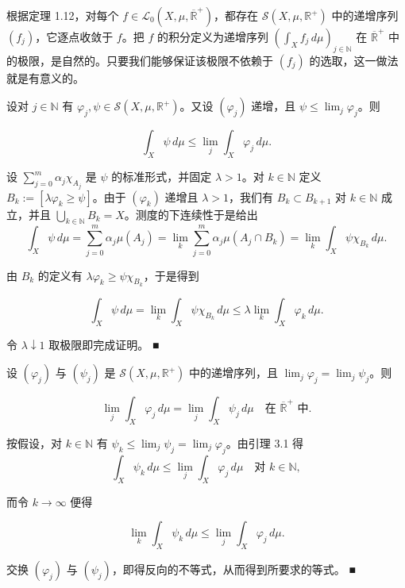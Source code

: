根据定理 1.12，对每个 $ f \in \mathcal{L}_0(X,\mu,\overline{\mathbb{R}}^+) $，都存在 $ \mathcal{S}(X,\mu,\mathbb{R}^+) $ 中的递增序列 $ (f_j) $，它逐点收敛于 $ f $。把 $ f $ 的积分定义为递增序列 $ (\int_X f_j\,d\mu)_{j\in\mathbb{N}} $ 在 $ \overline{\mathbb{R}}^+ $ 中的极限，是自然的。只要我们能够保证该极限不依赖于 $ (f_j) $ 的选取，这一做法就是有意义的。

\begin{lemma}

设对 $ j \in \mathbb{N} $ 有 $ \varphi_j, \psi \in \mathcal{S}(X,\mu,\mathbb{R}^+) $。又设 $ (\varphi_j) $ 递增，且 $ \psi \le \lim_j \varphi_j $。则

\[
\int_X \psi\,d\mu \le \lim_j \int_X \varphi_j\,d\mu .
\]

\proofhead
设 $ \sum_{j=0}^m \alpha_j \chi_{A_j} $ 是 $ \psi $ 的标准形式，并固定 $ \lambda > 1 $。对 $ k \in \mathbb{N} $ 定义 $ B_k := [\lambda\varphi_k \ge \psi] $。由于 $ (\varphi_k) $ 递增且 $ \lambda > 1 $，我们有 $ B_k \subset B_{k+1} $ 对 $ k \in \mathbb{N} $ 成立，并且 $ \bigcup_{k\in\mathbb{N}} B_k = X $。测度的下连续性于是给出
\[
\int_X \psi\,d\mu = \sum_{j=0}^m \alpha_j \mu(A_j) = \lim_k \sum_{j=0}^m \alpha_j \mu(A_j \cap B_k) = \lim_k \int_X \psi\chi_{B_k}\,d\mu .
\]

由 $ B_k $ 的定义有 $ \lambda\varphi_k \ge \psi\chi_{B_k} $，于是得到

\[
\int_X \psi\,d\mu = \lim_k \int_X \psi\chi_{B_k}\,d\mu \le \lambda \lim_k \int_X \varphi_k\,d\mu .
\]

令 $ \lambda \downarrow 1 $ 取极限即完成证明。 \nobreak\hspace{0.35em}■

\end{lemma}

\begin{corollary}

设 $ (\varphi_j) $ 与 $ (\psi_j) $ 是 $ \mathcal{S}(X,\mu,\mathbb{R}^+) $ 中的递增序列，且 $ \lim_j \varphi_j = \lim_j \psi_j $。则

\[
\lim_j \int_X \varphi_j\,d\mu = \lim_j \int_X \psi_j\,d\mu \quad \text{在 } \overline{\mathbb{R}}^+ \text{ 中} .
\]

\proofhead
按假设，对 $ k \in \mathbb{N} $ 有 $ \psi_k \le \lim_j \psi_j = \lim_j \varphi_j $。由引理 3.1 得
\[
\int_X \psi_k\,d\mu \le \lim_j \int_X \varphi_j\,d\mu \quad \text{对 } k \in \mathbb{N} ,
\]

而令 $ k \to \infty $ 便得

\[
\lim_k \int_X \psi_k\,d\mu \le \lim_j \int_X \varphi_j\,d\mu .
\]

交换 $ (\varphi_j) $ 与 $ (\psi_j) $，即得反向的不等式，从而得到所要求的等式。 \nobreak\hspace{0.35em}■

\end{corollary}

